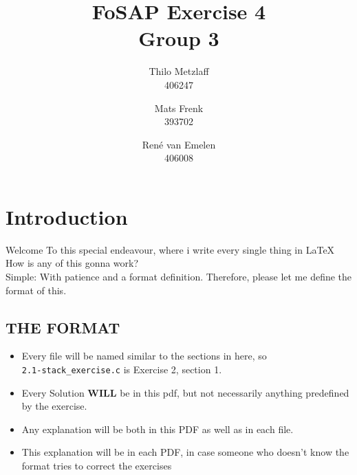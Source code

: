 \documentclass[a4paper, 11pt]{article}
\author{Thilo Metzlaff\\406247 \and Mats Frenk\\393702\and René van Emelen\\406008}
\title{FoSAP Exercise 4 \\ \large Group 3}
\begin{document}
    \maketitle
    \newpage

    \tableofcontents
    \newpage

    \section*{Introduction}
    Welcome To this special endeavour, where i write every single thing in \LaTeX{}
    How is any of this gonna work?\\
    Simple: With patience and a format definition. Therefore, please let me define the format of this.

    \subsection*{THE FORMAT}
    \begin{itemize}
        \item Every file will be named similar to the sections in here, so\\
              \texttt{2.1-stack\_exercise.c} is Exercise 2, section 1.
        \item Every Solution \textbf{WILL} be in this pdf, but not necessarily 
              anything predefined by the exercise.
        \item Any explanation will be both in this PDF as well as in each file.
        \item This explanation will be in each PDF, in case someone who doesn't
              know the format tries to correct the exercises
    \end{itemize}
    \newpage
\end{document}
